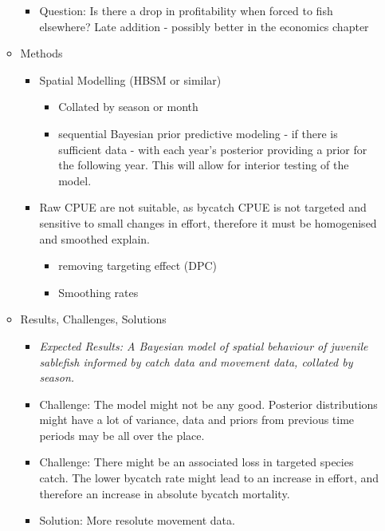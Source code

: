 \documentclass{article}
\newcommand{\sj}[1]{{\color{red}\mbox{}\marginpar{\raggedleft\hspace{0pt}*} #1}}
\begin{document}
\begin{itemize}
\begin{itemize}
\begin{itemize}
          \item Question: Is there a drop in profitability when forced to fish elsewhere? \sj{Late addition - possibly better in the economics chapter}
        \end{itemize}
      \item Methods
        \begin{itemize}
          \item Spatial Modelling (HBSM or similar) \citep{springford2008novel,sims2008modeling,lewison2009mapping}
            \begin{itemize}
              \item Collated by season or month
              \item sequential Bayesian prior predictive modeling - if there is sufficient data - with each year's posterior providing a prior for the following year. This will allow for interior testing of the model.
            \end{itemize}
          \item Raw CPUE are not suitable, as bycatch CPUE is not targeted and sensitive to small changes in effort, therefore it must be homogenised and smoothed \sj{explain}. 
            \begin{itemize}
              \item removing targeting effect (DPC) \citep{winker2014proof,winker2013comparison}
              \item Smoothing rates \citep{springford2008novel,sims2008modeling}
            \end{itemize}
        \end{itemize}
      \item Results, Challenges, Solutions
        \begin{itemize}
          \item {\it Expected Results: A Bayesian model of spatial behaviour of juvenile sablefish informed by catch data and movement data, collated by season.}
          \item Challenge: The model might not be any good. Posterior distributions might have a lot of variance, data and priors from previous time periods may be all over the place.
          \item Challenge: There might be an associated loss in targeted species catch. The lower bycatch rate might lead to an increase in effort, and therefore an increase in absolute bycatch mortality.
          \item Solution: More resolute movement data.
        \end{itemize}

\end{itemize}
\end{itemize}
\end{document}
